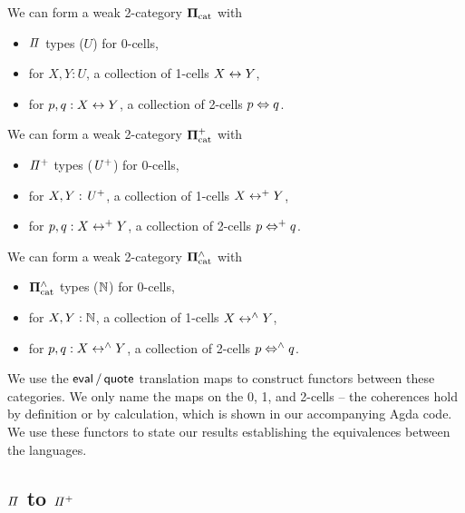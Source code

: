 \begin{toappendix}
  \begin{proposition}
    We can form a weak 2-category $\mathbf{\Pi}_{\mathrm{cat}}$ with
    \begin{itemize}
      \item $\mathit{\Pi}$ types ($U$) for 0-cells,
      \item for $X, Y : U$, a collection of 1-cells $X \mathrel{\leftrightarrow} Y$,
      \item for $p, q : X \mathrel{\leftrightarrow} Y$, a collection of 2-cells $p \mathrel{\Leftrightarrow} q$.
    \end{itemize}
  \end{proposition}

  \begin{proposition}
    We can form a weak 2-category $\mathbf{\Pi}^{+}_{\mathrm{cat}}$ with
    \begin{itemize}
      \item $\mathit{{\Pi}^{+}}$ types ($\mathit{U}^{+}$) for 0-cells,
      \item for $X, Y : \mathit{U}^{+}$, a collection of 1-cells $X \mathrel{\leftrightarrow^{+}} Y$,
      \item for $p, q : X \mathrel{\leftrightarrow^{+}} Y$, a collection of 2-cells $p \mathrel{\Leftrightarrow^{+}} q$.
    \end{itemize}
  \end{proposition}

  \begin{proposition}
    We can form a weak 2-category $\mathbf{\Pi}^{\wedge}_{\mathrm{cat}}$ with
    \begin{itemize}
      \item $\mathbf{\Pi}^{\wedge}_{\mathrm{cat}}$ types ($\mathbb{N}$) for 0-cells,
      \item for $X, Y : \mathbb{N}$, a collection of 1-cells $X \mathrel{\leftrightarrow^{\wedge}} Y$,
      \item for $p, q : X \mathrel{\leftrightarrow^{\wedge}} Y$, a collection of 2-cells $p \mathrel{\Leftrightarrow^{\wedge}} q$.
    \end{itemize}
  \end{proposition}
\end{toappendix}

We use the $\evalt/\quotet$ translation maps to construct functors between these categories. We only name the maps on
the 0, 1, and 2-cells -- the coherences hold by definition or by calculation, which is shown in our accompanying Agda
code. We use these functors to state our results establishing the equivalences between the languages.

\subsection{$\mathit{\Pi}$ to $\mathit{{\Pi}^{+}}$}

